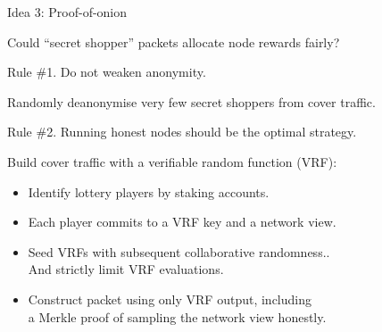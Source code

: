 \documentclass[fleqn,xcolor={usenames,dvipsnames},notes,aspectratio=169]{beamer} %
\begin{document}
\begin{frame}{Idea 3: Proof-of-onion}

Could ``secret shopper'' packets allocate node rewards fairly?

\bigskip\medskip

Rule \#1.  Do not weaken anonymity. \\ \medskip

Randomly deanonymise very few secret shoppers from cover traffic.

\bigskip

Rule \#2.  Running honest nodes should be the optimal strategy. \\ \medskip

Build cover traffic with a verifiable random function (VRF):
\begin{itemize}
\item Identify lottery players by staking accounts.
\item Each player commits to a VRF key and a network view.
\item Seed VRFs with subsequent collaborative randomness.. \\
 \hspace*{3pt}  And strictly limit VRF evaluations.
\item Construct packet using only VRF output, including \\
 \hspace*{3pt} a Merkle proof of sampling the network view honestly. 
\end{itemize}

\end{frame}


\end{document}
